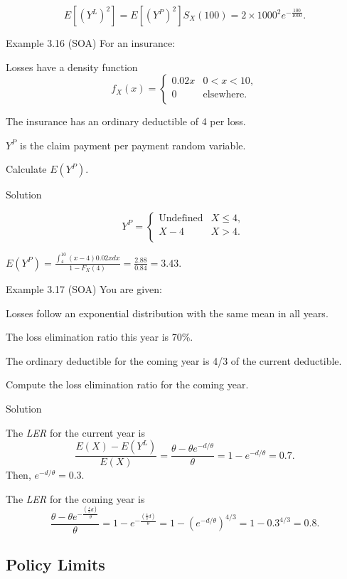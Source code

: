 \documentclass[]{book}
\begin{document}
\[E\left\lbrack \left( Y^{L} \right)^{2} \right\rbrack = E\left\lbrack \left( Y^{P} \right)^{2} \right\rbrack S_{X}\left( 100 \right) = 2 \times 1000^{2}e^{- \frac{100}{1000}}.\]

Example 3.16 (SOA) For an insurance:

Losses have a density function
\[f_{X}\left( x \right) = \left\{ \begin{matrix}
    0.02x & 0 < x  < 10, \\
    0 & \text{elsewhere.} \\
    \end{matrix} \right. \]

The insurance has an ordinary deductible of 4 per loss.

\(Y^{P}\) is the claim payment per payment random variable.

Calculate \(E\left( Y^{P} \right)\).

Solution

\[Y^{P} = \left\{ \begin{matrix}
\text{Undefined} & X \leq 4, \\
X - 4 & X > 4. \\
\end{matrix} \right.\ \]

\(E\left( Y^{P} \right) = \frac{\int_{4}^{10}\left( x - 4 \right)0.02xdx}{{1 - F}_{X}\left( 4 \right)} = \frac{2.88}{0.84} = 3.43\).

Example 3.17 (SOA) You are given:

Losses follow an exponential distribution with the same mean in all
years.

The loss elimination ratio this year is 70\%.

The ordinary deductible for the coming year is 4/3 of the current
deductible.

Compute the loss elimination ratio for the coming year.

Solution

The \emph{LER} for the current year is
\[\frac{E\left( X \right) - E\left( Y^{L} \right)}{E\left( X \right)} = \frac{\theta - \theta e^{- d / \theta}}{\theta} = 1 - e^{- d / \theta} = 0.7.\]
Then, \(e^{- d / \theta} = 0.3\).

The \emph{LER} for the coming year is
\[ \frac{\theta - \theta e^{- \frac{\left( \frac{4}{3}d \right)}{\theta}}}{\theta} = 1 - e^{- \frac{\left( \frac{4}{3} d \right)}{\theta}} = 1 - \left( e^{-d /\theta} \right)^{4/3} = 1 - {0.3}^{4/3} = 0.8 .\]

\subsection{Policy Limits}\label{PolicyLimits}
\end{document}
